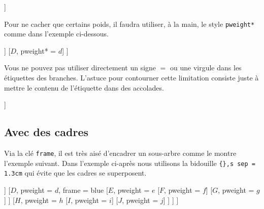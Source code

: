 \documentclass[12pt,a4paper]{article}
\begin{document}
\begin{latexex}
\begin{probatree*}
    [$A$, pweight = $a$
        [$B$, pweight = $b$]
        [$C$, pweight = $c$]
    ]
\end{probatree*}
\end{latexex}





Pour ne cacher que certains poids, il faudra utiliser, à la main, le style \verb+pweight*+ comme dans l'exemple ci-dessous.

\begin{latexex}
\begin{probatree}
    [
        [$A$, pweight = $a$
            [$B$, pweight* = $b$]
            [$C$, pweight  = $c$]
        ]
        [$D$, pweight* = $d$]
    ]
\end{probatree}
\end{latexex}





Vous ne pouvez pas utiliser directement un signe $=$ ou une virgule dans les étiquettes des branches. L'astuce pour contourner cette limitation consiste juste à mettre le contenu de l'étiquette dans des accolades.

\begin{latexex}
\begin{probatree}
    [
        [$A$, apweight = {$a = 0,1$}]
        [$B$, bpweight = $b$]
    ]
\end{probatree}
\end{latexex}




\subsection{Avec des cadres}


Via la clé \verb+frame+, il est très aisé d'encadrer un sous-arbre comme le montre l'exemple suivant. Dans l'exemple ci-après nous utilisons la bidouille \verb+{},s sep = 1.3cm+ qui évite que les cadres se superposent.

\begin{latexex}
\begin{probatree}
    [{}, s sep = 1.3cm 
        [$A$, pweight = $a$,
              frame   = red
            [$B$, pweight = $b$]
            [$C$, pweight = $c$]
        ]
        [$D$, pweight = $d$,
              frame   = blue
            [$E$, pweight = $e$
                [$F$, pweight = $f$]
                [$G$, pweight = $g$]
            ]
            [$H$, pweight = $h$
                [$I$, pweight = $i$]
                [$J$, pweight = $j$]
            ]
        ]
    ]
\end{probatree}
\end{latexex}
\end{document}
